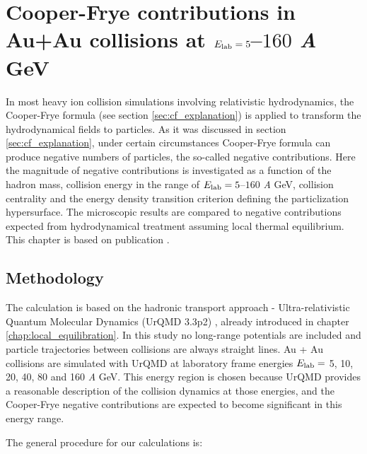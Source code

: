 \chapter{Cooper-Frye contributions in Au+Au collisions at $E_\mathrm{lab} = 5$--$160$ \emph{A} GeV}
\label{chap:cooper_frye}


In most heavy ion collision simulations involving relativistic hydrodynamics,
the Cooper-Frye formula (see section \ref{sec:cf_explanation}) is applied to
transform the hydrodynamical fields to particles. As it was discussed in
section \ref{sec:cf_explanation}, under certain circumstances Cooper-Frye
formula can produce negative numbers of particles, the so-called negative
contributions. Here the magnitude of negative contributions is investigated as
a function of the hadron mass, collision energy in the range of $E_\mathrm{lab} = 5$--$160$
\emph{A} GeV, collision centrality and the energy density transition criterion defining
the particlization hypersurface. The microscopic results are compared to
negative contributions expected from hydrodynamical treatment assuming local
thermal equilibrium. This chapter is based on publication \cite{Oliinychenko:2014tqa}.


\section{Methodology}
\label{sec:cf_Methodology}

The calculation is based on the hadronic transport approach - Ultra-relativistic
Quantum Molecular Dynamics (UrQMD 3.3p2) \cite{Bass:1998ca,Bleicher:1999xi},
already introduced in chapter \ref{chap:local_equilibration}.  In this study no
long-range potentials  are included and particle trajectories between
collisions are always straight lines. Au + Au collisions are simulated with
UrQMD at laboratory frame energies $E_\mathrm{lab} =$ 5, 10, 20, 40, 80 and 160 \emph{A} GeV.
This energy region is chosen because UrQMD provides a reasonable description of
the collision dynamics at those energies, and the Cooper-Frye negative
contributions are expected to become significant in this energy range.

The general procedure for our calculations is:

